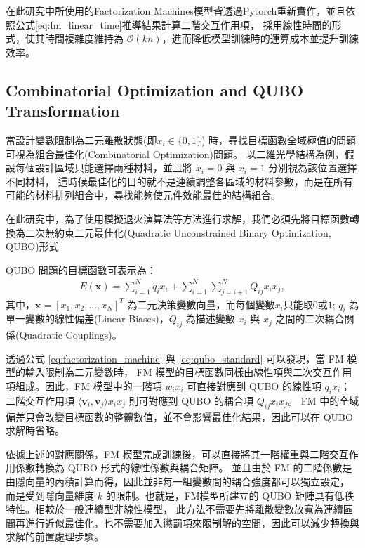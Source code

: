 在此研究中所使用的Factorization Machines模型皆透過Pytorch重新實作，並且依照公式\eqref{eq:fm_linear_time}推導結果計算二階交互作用項，
採用線性時間的形式，使其時間複雜度維持為 $\mathcal{O}(kn)$，進而降低模型訓練時的運算成本並提升訓練效率。

\subsection{Combinatorial Optimization and QUBO Transformation}
當設計變數限制為二元離散狀態(即$x_i \in \{0,1\}$) 時，尋找目標函數全域極值的問題可視為組合最佳化(Combinatorial Optimization)問題。
以二維光學結構為例，假設每個設計區域只能選擇兩種材料，並且將 $x_i=0$ 與 $x_i=1$ 分別視為該位置選擇不同材料，
這時候最佳化的目的就不是連續調整各區域的材料參數，而是在所有可能的材料排列組合中，尋找能夠使元件效能最佳的結構組合。

在此研究中，為了使用模擬退火演算法等方法進行求解，我們必須先將目標函數轉換為二次無約束二元最佳化(Quadratic Unconstrained Binary Optimization, QUBO)形式

QUBO 問題的目標函數可表示為：
\begin{align}
E(\mathbf{x}) = \sum_{i=1}^{N} q_i x_i + \sum_{i=1}^{N} \sum_{j=i+1}^{N} Q_{ij} x_i x_j ,
\label{eq:qubo_standard}
\end{align}
其中，$\mathbf{x}=[x_1,x_2,\dots,x_N]^T$ 為二元決策變數向量，而每個變數$x_i$只能取$0$或$1$;
$q_i$ 為單一變數的線性偏差(Linear Biases)，$Q_{ij}$ 為描述變數 $x_i$ 與 $x_j$ 之間的二次耦合關係(Quadratic Couplings)。

透過公式 \eqref{eq:factorization_machine} 與 \eqref{eq:qubo_standard} 可以發現，當 FM 模型的輸入限制為二元變數時，
FM 模型的目標函數同樣由線性項與二次交互作用項組成。因此，FM 模型中的一階項 $w_i x_i$ 可直接對應到 QUBO 的線性項 $q_i x_i$；
二階交互作用項 $\langle\mathbf{v}_i,\mathbf{v}_j\rangle x_i x_j$ 則可對應到 QUBO 的耦合項 $Q_{ij}x_i x_j$。
FM 中的全域偏差只會改變目標函數的整體數值，並不會影響最佳化結果，因此可以在 QUBO 求解時省略。

依據上述的對應關係，FM 模型完成訓練後，可以直接將其一階權重與二階交互作用係數轉換為 QUBO 形式的線性係數與耦合矩陣。
並且由於 FM 的二階係數是由隱向量的內積計算而得，因此並非每一組變數間的耦合強度都可以獨立設定，
而是受到隱向量維度 $k$ 的限制。也就是，FM模型所建立的 QUBO 矩陣具有低秩特性。相較於一般連續型非線性模型，
此方法不需要先將離散變數放寬為連續區間再進行近似最佳化，也不需要加入懲罰項來限制解的空間，因此可以減少轉換與求解的前置處理步驟。

